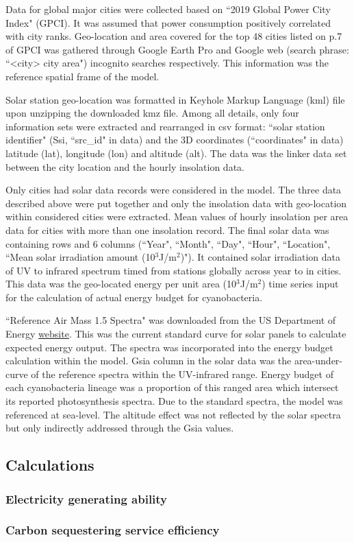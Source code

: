 \documentclass[../thesis.tex]{subfiles} %
\begin{document}
Data for global major cities were collected based on ``2019 Global Power City Index"\autocite{GPCI2019_summary} (GPCI).  It was assumed that power consumption positively correlated with city ranks.  Geo-location and area covered for the top 48 cities listed on p.7 of GPCI was gathered through Google Earth Pro\autocite{gEarth} and Google web (search phrase: ``<city> city area") incognito searches respectively.  This information was the reference spatial frame of the model.

Solar station geo-location was formatted in Keyhole Markup Language (kml) file upon unzipping the downloaded kmz file.  Among all details, only four information sets were extracted and rearranged in csv format: ``solar station identifier" (Ssi, ``src\_id" in data) and the 3D coordinates (``coordinates" in data) latitude (lat), longitude (lon) and altitude (alt).  The data was the linker data set between the city location and the hourly insolation data.

Only cities had solar data records were considered in the model.  The three data described above were put together and only the insolation data with geo-location within considered cities were extracted.  Mean values of hourly insolation per area data for cities with more than one insolation record.  The final solar data was containing 
 rows and 6 columns (``Year", ``Month", ``Day", ``Hour", ``Location", ``Mean solar irradiation amount (10$^{3}$J/m$^{2}$)").  It contained solar irradiation data of UV to infrared spectrum timed from 
 stations globally across year 
 to 
 in 
 cities.  This data was the geo-located energy per unit area (10$^{3}$J/m$^{2}$) time series input for the calculation of actual energy budget for cyanobacteria.

``Reference Air Mass 1.5 Spectra" was downloaded from the US Department of Energy \href{https://www.nrel.gov/grid/solar-resource/spectra-am1.5.html}{website}.  This was the current standard curve for solar panels to calculate expected energy output.  The spectra was incorporated into the energy budget calculation within the model.  Gsia column in the solar data was the area-under-curve of the reference spectra within the UV-infrared range.  Energy budget of each cyanobacteria lineage was a proportion of this ranged area which intersect its reported photosynthesis spectra.  Due to the standard spectra, the model was referenced at sea-level.  The altitude effect was not reflected by the solar spectra but only indirectly addressed through the Gsia values.

\subsection{Calculations}
\subsubsection{Electricity generating ability}

\subsubsection{Carbon sequestering service efficiency}
\end{document}
